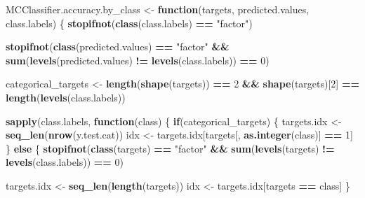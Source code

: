 \documentclass[
]{report}
\newenvironment{Shaded}{\begin{snugshade}}{\end{snugshade}}
\newcommand{\ControlFlowTok}[1]{\textcolor[rgb]{0.13,0.29,0.53}{\textbf{#1}}}
\newcommand{\DecValTok}[1]{\textcolor[rgb]{0.00,0.00,0.81}{#1}}
\newcommand{\FunctionTok}[1]{\textcolor[rgb]{0.13,0.29,0.53}{\textbf{#1}}}
\newcommand{\NormalTok}[1]{#1}
\newcommand{\OtherTok}[1]{\textcolor[rgb]{0.56,0.35,0.01}{#1}}
\newcommand{\SpecialCharTok}[1]{\textcolor[rgb]{0.81,0.36,0.00}{\textbf{#1}}}
\newcommand{\StringTok}[1]{\textcolor[rgb]{0.31,0.60,0.02}{#1}}
\begin{document}
\begin{Shaded}
\begin{Highlighting}[]
\NormalTok{MCClassifier.accuracy.by\_class }\OtherTok{\textless{}{-}} \ControlFlowTok{function}\NormalTok{(targets,}
\NormalTok{                                           predicted.values,}
\NormalTok{                                           class.labels) \{}
  \FunctionTok{stopifnot}\NormalTok{(}\FunctionTok{class}\NormalTok{(class.labels) }\SpecialCharTok{==} \StringTok{"factor"}\NormalTok{)}
  
  \FunctionTok{stopifnot}\NormalTok{(}\FunctionTok{class}\NormalTok{(predicted.values) }\SpecialCharTok{==} \StringTok{"factor"} \SpecialCharTok{\&\&} 
              \FunctionTok{sum}\NormalTok{(}\FunctionTok{levels}\NormalTok{(predicted.values) }\SpecialCharTok{!=} \FunctionTok{levels}\NormalTok{(class.labels)) }\SpecialCharTok{==} \DecValTok{0}\NormalTok{)}

\NormalTok{  categorical\_targets }\OtherTok{\textless{}{-}} 
    \FunctionTok{length}\NormalTok{(}\FunctionTok{shape}\NormalTok{(targets)) }\SpecialCharTok{==} \DecValTok{2} \SpecialCharTok{\&\&} 
    \FunctionTok{shape}\NormalTok{(targets)[}\DecValTok{2}\NormalTok{] }\SpecialCharTok{==} \FunctionTok{length}\NormalTok{(}\FunctionTok{levels}\NormalTok{(class.labels))}
  
  \FunctionTok{sapply}\NormalTok{(class.labels, }\ControlFlowTok{function}\NormalTok{(class) \{}
    \ControlFlowTok{if}\NormalTok{(categorical\_targets) \{}
\NormalTok{      targets.idx }\OtherTok{\textless{}{-}} \FunctionTok{seq\_len}\NormalTok{(}\FunctionTok{nrow}\NormalTok{(y.test.cat))      }
\NormalTok{      idx }\OtherTok{\textless{}{-}}\NormalTok{ targets.idx[targets[, }\FunctionTok{as.integer}\NormalTok{(class)] }\SpecialCharTok{==} \DecValTok{1}\NormalTok{]}
\NormalTok{    \} }\ControlFlowTok{else}\NormalTok{ \{}
      \FunctionTok{stopifnot}\NormalTok{(}\FunctionTok{class}\NormalTok{(targets) }\SpecialCharTok{==} \StringTok{"factor"} \SpecialCharTok{\&\&} 
                  \FunctionTok{sum}\NormalTok{(}\FunctionTok{levels}\NormalTok{(targets) }\SpecialCharTok{!=} \FunctionTok{levels}\NormalTok{(class.labels)) }\SpecialCharTok{==} \DecValTok{0}\NormalTok{)}
      
\NormalTok{      targets.idx }\OtherTok{\textless{}{-}} \FunctionTok{seq\_len}\NormalTok{(}\FunctionTok{length}\NormalTok{(targets))}
\NormalTok{      idx }\OtherTok{\textless{}{-}}\NormalTok{ targets.idx[targets }\SpecialCharTok{==}\NormalTok{ class]}
\NormalTok{    \}}


\end{Highlighting}
\end{Shaded}
\end{document}
